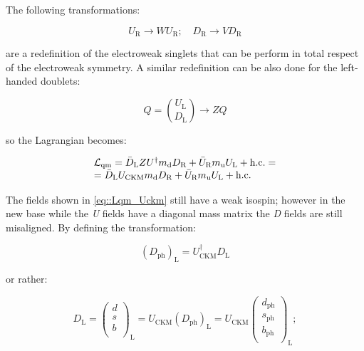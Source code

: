 The following transformations:

\begin{equation}
U_{\text{R}} \longrightarrow W U_{\text{R}}; \quad D_{\text{R}} \longrightarrow V D_{\text{R}}
\end{equation}

are a redefinition of the electroweak singlets that can be perform in total respect of the electroweak symmetry. A similar redefinition can be also done for the left-handed doublets:

\begin{equation}
Q = \binom{U_{\text{L}}}{D_{\text{L}}} \longrightarrow ZQ
\end{equation}

so the Lagrangian becomes:

\begin{equation}
\begin{array}{l c l}
\mathcal{L}_{\text{qm}} = \bar{D}_{\text{L}}ZU^{\dagger}m_{\text{d}}D_{\text{R}} + \bar{U}_{\text{R}}m_{\text{u}}U_{\text{L}} + \text{h.c.} = \\
= \bar{D}_{\text{L}}U_{\text{CKM}}m_{\text{d}}D_{\text{R}} + \bar{U}_{\text{R}}m_{\text{u}}U_{\text{L}} + \text{h.c.}
\label{eq::Lqm_Uckm}
\end{array}
\end{equation}

The fields shown in \autoref{eq::Lqm_Uckm} still have a weak isospin; however in the new base while the \textit{U} fields have a diagonal mass matrix the \textit{D} fields are still misaligned. By defining the transformation:

\begin{equation}
\left(D_{\text{ph}}\right)_{\text{L}} = U^{\dagger}_{\text{CKM}}D_{\text{L}}
\end{equation}

or rather:

\begin{equation}
D_{\text{L}} = 
\begin{pmatrix}
d  \\
s  \\
b \\
\end{pmatrix}
_{\text{L}} =
U_{\text{CKM}}\left(D_{\text{ph}}\right)_{\text{L}} = U_{\text{CKM}}
\begin{pmatrix}
d_{\text{ph}}  \\
s_{\text{ph}}  \\
b_{\text{ph}} \\
\end{pmatrix}
_{\text{L}} ;
\end{equation}

